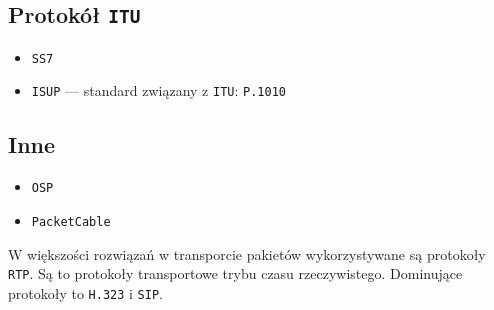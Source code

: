 \documentclass{article}
\begin{document}
\subsection{Protokół {\tt ITU}}
\begin{itemize}
    \item {\tt SS7}
    \item {\tt ISUP} --- standard związany z {\tt ITU}: {\tt P.1010}
\end{itemize}
\subsection{Inne}
\begin{itemize}
    \item {\tt OSP}
    \item {\tt PacketCable}
\end{itemize}
W większości rozwiązań w transporcie pakietów wykorzystywane są protokoły {\tt RTP}.
Są to protokoły transportowe trybu czasu rzeczywistego.
Dominujące protokoły to {\tt H.323} i {\tt SIP}.
\end{document}

